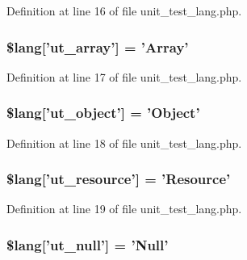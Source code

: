 Definition at line 16 of file unit\-\_\-test\-\_\-lang.\-php.

\hypertarget{unit__test__lang_8php_a3d6aa3d4ed503f15adc21813a9018950}{
\subsubsection[{\$lang}]{\setlength{\rightskip}{0pt plus 5cm}\$lang\mbox{[}'ut\-\_\-array'\mbox{]} = 'Array'}}\label{unit__test__lang_8php_a3d6aa3d4ed503f15adc21813a9018950}


Definition at line 17 of file unit\-\_\-test\-\_\-lang.\-php.

\hypertarget{unit__test__lang_8php_a771c29e5029c601b1f3e7c4e6fb93c94}{
\subsubsection[{\$lang}]{\setlength{\rightskip}{0pt plus 5cm}\$lang\mbox{[}'ut\-\_\-object'\mbox{]} = 'Object'}}\label{unit__test__lang_8php_a771c29e5029c601b1f3e7c4e6fb93c94}


Definition at line 18 of file unit\-\_\-test\-\_\-lang.\-php.

\hypertarget{unit__test__lang_8php_a6653a67c4fc0bc5ade6aaf327eed05bf}{
\subsubsection[{\$lang}]{\setlength{\rightskip}{0pt plus 5cm}\$lang\mbox{[}'ut\-\_\-resource'\mbox{]} = 'Resource'}}\label{unit__test__lang_8php_a6653a67c4fc0bc5ade6aaf327eed05bf}


Definition at line 19 of file unit\-\_\-test\-\_\-lang.\-php.

\hypertarget{unit__test__lang_8php_ad4aef71cf1e43fa884add4613da590cb}{
\subsubsection[{\$lang}]{\setlength{\rightskip}{0pt plus 5cm}\$lang\mbox{[}'ut\-\_\-null'\mbox{]} = 'Null'}}\label{unit__test__lang_8php_ad4aef71cf1e43fa884add4613da590cb}


